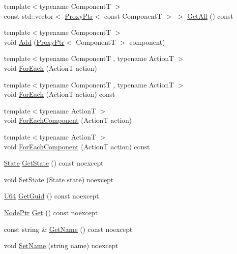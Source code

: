 \begin{DoxyCompactItemize}
\item 
{\footnotesize template$<$typename ComponentT $>$ }\\const std\+::vector$<$ \hyperlink{classmage_1_1_proxy_ptr}{Proxy\+Ptr}$<$ const ComponentT $>$ $>$ \hyperlink{classmage_1_1_node_a920ff966a7f970189fcbae86025ab3aa}{Get\+All} () const
\item 
{\footnotesize template$<$typename ComponentT $>$ }\\void \hyperlink{classmage_1_1_node_a58452a6195ebea7a1a7a26f9a4dd8102}{Add} (\hyperlink{classmage_1_1_proxy_ptr}{Proxy\+Ptr}$<$ ComponentT $>$ component)
\item 
{\footnotesize template$<$typename ComponentT , typename ActionT $>$ }\\void \hyperlink{classmage_1_1_node_a5ec6963ed4eb9d0463e220a53555d27a}{For\+Each} (ActionT action)
\item 
{\footnotesize template$<$typename ComponentT , typename ActionT $>$ }\\void \hyperlink{classmage_1_1_node_a27787099b85542ab2e5d3901bdfa8684}{For\+Each} (ActionT action) const
\item 
{\footnotesize template$<$typename ActionT $>$ }\\void \hyperlink{classmage_1_1_node_ac90a83642d3043ac6fc4efd14f922877}{For\+Each\+Component} (ActionT action)
\item 
{\footnotesize template$<$typename ActionT $>$ }\\void \hyperlink{classmage_1_1_node_ac3c83c2fcd0ee99277d0120396ffa81e}{For\+Each\+Component} (ActionT action) const
\item 
\hyperlink{namespacemage_ae47d13d8477ee94893b9a3947d28eebc}{State} \hyperlink{classmage_1_1_node_a05980bc835cf8da96a9abb225eae72da}{Get\+State} () const noexcept
\item 
void \hyperlink{classmage_1_1_node_a9511a52ddcc0bba71a0353338dcd1d9b}{Set\+State} (\hyperlink{namespacemage_ae47d13d8477ee94893b9a3947d28eebc}{State} state) noexcept
\item 
\hyperlink{namespacemage_a6672cf3c861707ce4a3235a3eb43941d}{U64} \hyperlink{classmage_1_1_node_a69d5c613982a4dfd5175538aff6a07a5}{Get\+Guid} () const noexcept
\item 
\hyperlink{classmage_1_1_node_ac575dc006e0ae1134277ade977dc06b6}{Node\+Ptr} \hyperlink{classmage_1_1_node_ac317011c240a845fbdb7209e26d560f2}{Get} () const noexcept
\item 
const string \& \hyperlink{classmage_1_1_node_a206e7c7ef80a0561b31ebbb9d05c98a0}{Get\+Name} () const noexcept
\item 
void \hyperlink{classmage_1_1_node_a78e4ef8457d200662d2f4881cef08688}{Set\+Name} (string name) noexcept
\end{DoxyCompactItemize}
